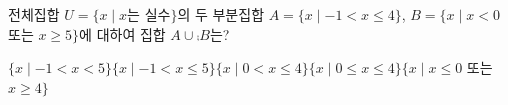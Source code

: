 전체집합 $U=\{x \mid x$는 실수$\}$의 두 부분집합 $A=\{x \mid -1<x\le 4\}$, $B=\{x \mid x<0$ 또는 $x\ge 5\}$에 대하여 집합 $A\cup\comp{B}$는?
\begin{choicesii}{$\{x \mid -1<x<5\}$}{$\{x \mid -1<x\le 5\}$}{$\{x \mid 0<x\le 4\}$}{$\{x \mid 0\le x\le 4\}$}{$\{x \mid x\le 0$ 또는 $x\ge 4\}$}\end{choicesii}
